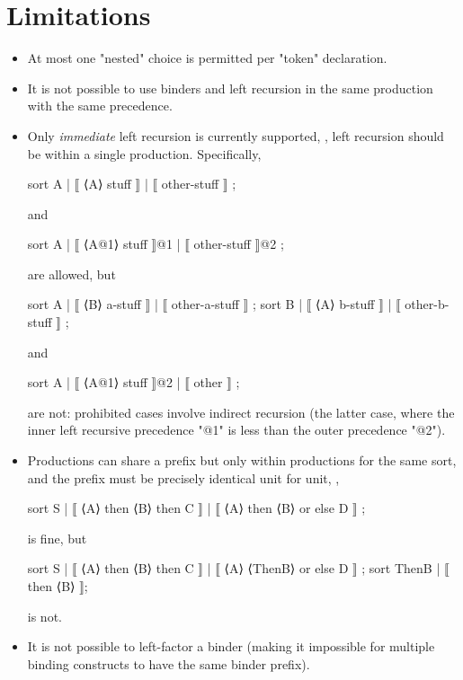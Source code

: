 \documentclass[11pt]{article} %
\begin{document}
\section{Limitations}\label{app:limits}

\begin{itemize}

\item At most one "nested" choice is permitted per "token" declaration.

\item It is not possible to use binders and left recursion in the same production with the same
  precedence.

\item Only \emph{immediate} left recursion is currently supported, \ie, left recursion should be
  within a single production. Specifically,
  \begin{hacs}
    sort A | ⟦ ⟨A⟩ stuff ⟧ | ⟦ other-stuff ⟧ ;
  \end{hacs}
  and 
  \begin{hacs}
    sort A | ⟦ ⟨A@1⟩ stuff ⟧@1 | ⟦ other-stuff ⟧@2 ;
  \end{hacs}
  are allowed, but
  \begin{hacs}
    sort A | ⟦ ⟨B⟩ a-stuff ⟧ | ⟦ other-a-stuff ⟧ ;
    sort B | ⟦ ⟨A⟩ b-stuff ⟧ | ⟦ other-b-stuff ⟧ ;
  \end{hacs}
  and 
  \begin{hacs}
    sort A  | ⟦ ⟨A@1⟩ stuff ⟧@2 | ⟦ other ⟧ ;
  \end{hacs}
  are not: prohibited cases involve indirect recursion (the latter case, where the inner left
  recursive precedence "@1" is less than the outer precedence "@2").

\item Productions can share a prefix but only within productions for the same sort, and the prefix
  must be precisely identical unit for unit, \ie,
  \begin{hacs}
    sort S | ⟦ ⟨A⟩ then ⟨B⟩ then C ⟧
           | ⟦ ⟨A⟩ then ⟨B⟩ or else D ⟧ ;
  \end{hacs}
  is fine, but
  \begin{hacs}
    sort S | ⟦ ⟨A⟩ then ⟨B⟩ then C ⟧
           | ⟦ ⟨A⟩ ⟨ThenB⟩ or else D ⟧ ;
    sort ThenB | ⟦ then ⟨B⟩ ⟧;
  \end{hacs}
  is not.

\item It is not possible to left-factor a binder (making it impossible for multiple binding
  constructs to have the same binder prefix).


\end{itemize}
\end{document}
